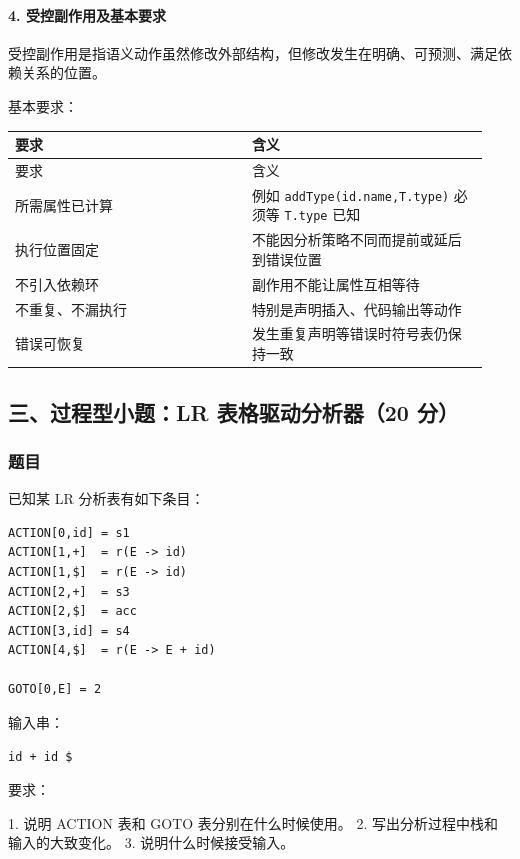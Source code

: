 \documentclass[UTF8]{ctexart}
\begin{document}
\paragraph*{4. 受控副作用及基本要求}

受控副作用是指语义动作虽然修改外部结构，但修改发生在明确、可预测、满足依赖关系的位置。

基本要求：

\begin{longtable}{|p{0.47\linewidth}|p{0.47\linewidth}|}
\hline
要求 & 含义 \\
\hline
\endfirsthead
要求 & 含义 \\
\hline
\endhead
所需属性已计算 & 例如 \texttt{addType(id.name,T.type)} 必须等 \texttt{T.type} 已知 \\
\hline
执行位置固定 & 不能因分析策略不同而提前或延后到错误位置 \\
\hline
不引入依赖环 & 副作用不能让属性互相等待 \\
\hline
不重复、不漏执行 & 特别是声明插入、代码输出等动作 \\
\hline
错误可恢复 & 发生重复声明等错误时符号表仍保持一致 \\
\hline
\end{longtable}

\subsection*{三、过程型小题：LR 表格驱动分析器（20 分）}

\subsubsection*{题目}

已知某 LR 分析表有如下条目：

\begin{Verbatim}[fontsize=\small,breaklines=true]
ACTION[0,id] = s1
ACTION[1,+]  = r(E -> id)
ACTION[1,$]  = r(E -> id)
ACTION[2,+]  = s3
ACTION[2,$]  = acc
ACTION[3,id] = s4
ACTION[4,$]  = r(E -> E + id)

GOTO[0,E] = 2
\end{Verbatim}

输入串：

\begin{Verbatim}[fontsize=\small,breaklines=true]
id + id $
\end{Verbatim}

要求：

1. 说明 ACTION 表和 GOTO 表分别在什么时候使用。 2. 写出分析过程中栈和输入的大致变化。 3. 说明什么时候接受输入。
\end{document}
